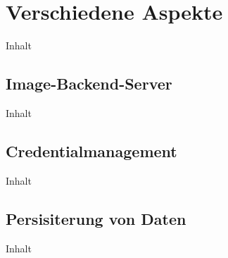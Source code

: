 \chapter{Verschiedene Aspekte\label{chap4:Viertes-Kapitel}}

Inhalt

\section{Image-Backend-Server\label{sec4.1:Unterpunkt-1}}

Inhalt

\section{Credentialmanagement\label{sec4.2:Unterpunkt-2}}

Inhalt

\section{Persisiterung von Daten\label{sec4.3:Unterpunkt-3}}

Inhalt